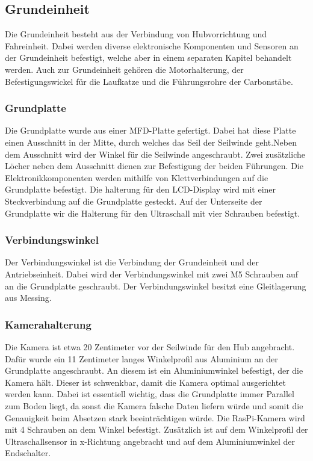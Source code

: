 \documentclass[a4paper]{report}
\begin{document}
\subsection{Grundeinheit}
\label{ssec:GrundeinheitBeschrieb}
Die Grundeinheit besteht aus der Verbindung von Hubvorrichtung und Fahreinheit. Dabei werden diverse elektronische Komponenten und Sensoren an der Grundeinheit befestigt, welche aber in einem separaten Kapitel behandelt werden. Auch zur Grundeinheit gehören die Motorhalterung, der Befestigungswickel für die Laufkatze und die Führungsrohre der Carbonstäbe.

\subsubsection{Grundplatte}
\label{sssec:GrundplatteBeschrieb}
Die Grundplatte wurde aus einer MFD-Platte gefertigt. Dabei hat diese Platte einen Ausschnitt in der Mitte, durch welches das Seil der Seilwinde geht.Neben dem Ausschnitt wird der Winkel für die Seilwinde angeschraubt. Zwei zusätzliche Löcher neben dem Ausschnitt dienen zur Befestigung der beiden Führungen. Die Elektronikkomponenten werden mithilfe von Klettverbindungen auf die Grundplatte befestigt. Die halterung für den LCD-Display wird mit einer Steckverbindung auf die Grundplatte gesteckt. Auf der Unterseite der Grundplatte wir die Halterung für den Ultraschall mit vier Schrauben befestigt.

\subsubsection{Verbindungswinkel}
\label{sssec:VerbindungswinkelBeschrieb}
Der Verbindungswinkel ist die Verbindung der Grundeinheit und der Antriebseinheit. Dabei wird der Verbindungswinkel mit zwei M5 Schrauben auf an die Grundplatte geschraubt. Der Verbindungswinkel besitzt eine Gleitlagerung aus Messing.

\subsubsection{Kamerahalterung} %
Die Kamera ist etwa 20 Zentimeter vor der Seilwinde für den Hub angebracht. Dafür wurde ein 11 Zentimeter langes Winkelprofil aus Aluminium an der Grundplatte angeschraubt. An diesem ist ein Aluminiumwinkel befestigt, der die Kamera hält. Dieser ist schwenkbar, damit die Kamera optimal ausgerichtet werden kann. Dabei ist essentiell wichtig, dass die Grundplatte immer Parallel zum Boden liegt, da sonst die Kamera falsche Daten liefern würde und somit die Genauigkeit beim Absetzen stark beeinträchtigen würde. Die RasPi-Kamera wird mit 4 Schrauben an dem Winkel befestigt. Zusätzlich ist auf dem Winkelprofil der Ultraschallsensor in x-Richtung angebracht und auf dem Aluminiumwinkel der Endschalter.
\end{document}
